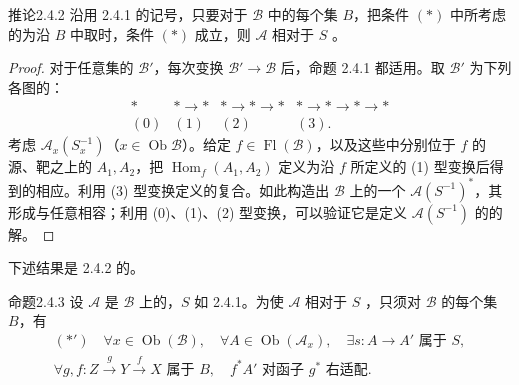 \begin{SGAresult}{推论}{2.4.2}
沿用 2.4.1 的记号，只要对于 $\mathcal B$ 中的每个集 $B$，把条件 $(*)$ 中所考虑的为沿 $B$ 中取时，条件 $(*)$ 成立，则 $\mathcal A$ 相对于 $S$ 。
\end{SGAresult}
\begin{proof}
对于任意集的 $\mathcal B'$，每次变换 $\mathcal B'\to\mathcal B$ 后，命题 2.4.1 都适用。取 $\mathcal B'$ 为下列各图的：
\[
\begin{array}{cccc}
* & *\longrightarrow * & *\longrightarrow *\longrightarrow * & *\longrightarrow *\longrightarrow *\longrightarrow *\\[1ex]
(0)&(1)&(2)&(3).
\end{array}
\]
考虑 $\mathcal A_x(S_x^{-1})$（$x\in\operatorname{Ob}\mathcal B$）。给定 $f\in\operatorname{Fl}(\mathcal B)$，以及这些中分别位于 $f$ 的源、靶之上的 $A_1,A_2$，把 $\operatorname{Hom}_f(A_1,A_2)$ 定义为沿 $f$ 所定义的 (1) 型变换后得到的相应。利用 (3) 型变换定义的复合。如此构造出 $\mathcal B$ 上的一个 $\mathcal A(S^{-1})^*$，其形成与任意相容；利用 (0)、(1)、(2) 型变换，可以验证它是定义 $\mathcal A(S^{-1})$ 的的解。
\end{proof}
下述结果是 2.4.2 的。

\begin{SGAresult}{命题}{2.4.3}
设 $\mathcal A$ 是 $\mathcal B$ 上的，$S$ 如 2.4.1。为使 $\mathcal A$ 相对于 $S$ ，只须对 $\mathcal B$ 的每个集 $B$，有
\[
\begin{gathered}
(*')\quad\forall x\in\operatorname{Ob}(\mathcal B),\quad\forall A\in\operatorname{Ob}(\mathcal A_x),\quad\exists s:A\to A'\text{ 属于 }S,\\
\forall g,f:Z\xrightarrow{g}Y\xrightarrow{f}X\text{ 属于 }B,\quad
f^*A'\text{ 对函子 }g^*\text{ 右适配}.
\end{gathered}
\]
\end{SGAresult}

